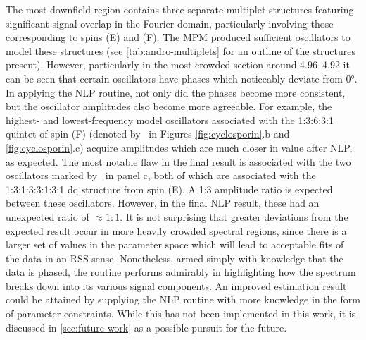 The most downfield region contains three separate multiplet structures
featuring significant signal overlap in the Fourier domain, particularly
involving those corresponding to spins (E) and (F).
The \ac{MPM} produced sufficient oscillators to model these
structures (see \cref{tab:andro-multiplets} for an outline of the structures
present).
However, particularly in the most crowded section around
\SIrange{4.96}{4.92}{\partspermillion} it can be seen that certain oscillators
have phases which noticeably deviate from \ang{0}. In applying the \ac{NLP}
routine, not only did the phases become more consistent,
but the oscillator amplitudes also become more agreeable.
For example, the highest- and lowest-frequency model oscillators
associated with the 1:3:6:3:1 quintet of spin (F) (denoted by
\textdagger\ in Figures \ref{fig:cyclosporin}.b and \ref{fig:cyclosporin}.c)
acquire amplitudes which are much closer in value after \ac{NLP}, as expected.
The most
notable flaw in the final result is associated with the two oscillators marked
by \textdaggerdbl\ in panel c, both of which are associated with the
1:3:1:3:3:1:3:1 dq structure from spin (E). A 1:3 amplitude ratio is expected
between these oscillators. However, in the final \ac{NLP} result, these
had an unexpected ratio of $\approx 1:1$. It is not surprising
that greater deviations from the expected result occur in more heavily crowded spectral
regions, since there is a larger set of values in the parameter space which
will lead to acceptable fits of the data in an \ac{RSS} sense. Nonetheless,
armed simply with knowledge that the data is phased, the routine performs
admirably in highlighting  how the spectrum breaks down into its various
signal components. An improved estimation result could be attained by
supplying the \ac{NLP} routine with more knowledge in the form of parameter
constraints. While this has not been implemented in this work, it is discussed
in \cref{sec:future-work} as a possible pursuit for the future.
